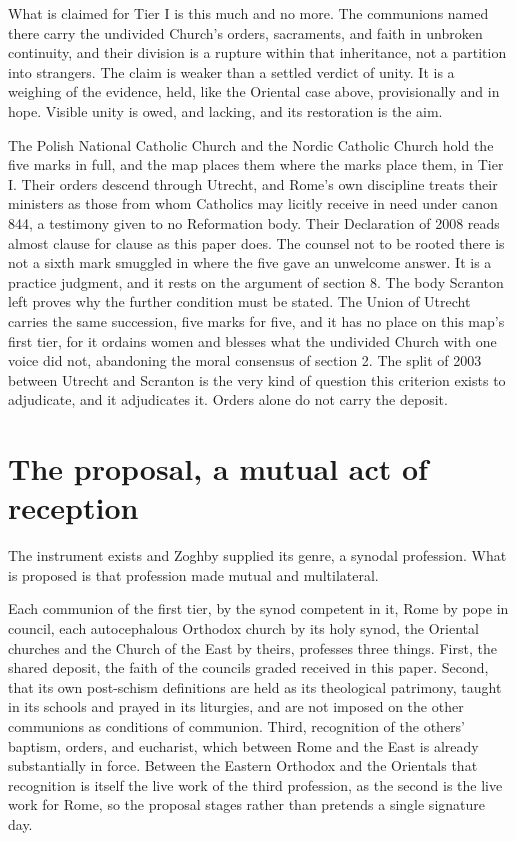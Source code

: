 \documentclass[11pt,twoside]{article}
\newcommand{\unit}[1]{\needspace{3\baselineskip}\par\medskip{\normalfont\bfseries\color{subhead}#1}\par\nobreak\smallskip}
\begin{document}
What is claimed for Tier I is this much and no more. The communions named there carry the undivided Church's orders, sacraments, and faith in unbroken continuity, and their division is a rupture within that inheritance, not a partition into strangers. The claim is weaker than a settled verdict of unity. It is a weighing of the evidence, held, like the Oriental case above, provisionally and in hope. Visible unity is owed, and lacking, and its restoration is the aim.

\unit{The Union of Scranton.}
The Polish National Catholic Church and the Nordic Catholic Church hold the five marks in full, and the map places them where the marks place them, in Tier I. Their orders descend through Utrecht, and Rome's own discipline treats their ministers as those from whom Catholics may licitly receive in need under canon 844, a testimony given to no Reformation body. Their Declaration of 2008 reads almost clause for clause as this paper does. The counsel not to be rooted there is not a sixth mark smuggled in where the five gave an unwelcome answer. It is a practice judgment, and it rests on the argument of section 8. The body Scranton left proves why the further condition must be stated. The Union of Utrecht carries the same succession, five marks for five, and it has no place on this map's first tier, for it ordains women and blesses what the undivided Church with one voice did not, abandoning the moral consensus of section 2. The split of 2003 between Utrecht and Scranton is the very kind of question this criterion exists to adjudicate, and it adjudicates it. Orders alone do not carry the deposit.

\section{The proposal, a mutual act of reception}
The instrument exists and Zoghby supplied its genre, a synodal profession. What is proposed is that profession made mutual and multilateral.

\unit{The professions.}
Each communion of the first tier, by the synod competent in it, Rome by pope in council, each autocephalous Orthodox church by its holy synod, the Oriental churches and the Church of the East by theirs, professes three things. First, the shared deposit, the faith of the councils graded received in this paper. Second, that its own post-schism definitions are held as its theological patrimony, taught in its schools and prayed in its liturgies, and are not imposed on the other communions as conditions of communion. Third, recognition of the others' baptism, orders, and eucharist, which between Rome and the East is already substantially in force. Between the Eastern Orthodox and the Orientals that recognition is itself the live work of the third profession, as the second is the live work for Rome, so the proposal stages rather than pretends a single signature day.
\end{document}
